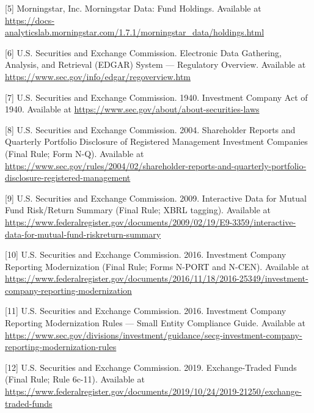 \documentclass[sigconf]{acmart}
\begin{document}
[5] Morningstar, Inc. Morningstar Data: Fund Holdings. Available at
\url{https://docs-analyticslab.morningstar.com/1.7.1/morningstar_data/holdings.html}

[6] U.S. Securities and Exchange Commission. Electronic Data Gathering,
Analysis, and Retrieval (EDGAR) System --- Regulatory Overview. Available
at \url{https://www.sec.gov/info/edgar/regoverview.htm}

[7] U.S. Securities and Exchange Commission. 1940. Investment Company Act
of 1940. Available at \url{https://www.sec.gov/about/about-securities-laws}

[8] U.S. Securities and Exchange Commission. 2004. Shareholder Reports and
Quarterly Portfolio Disclosure of Registered Management Investment
Companies (Final Rule; Form N-Q). Available at
\url{https://www.sec.gov/rules/2004/02/shareholder-reports-and-quarterly-portfolio-disclosure-registered-management}

[9] U.S. Securities and Exchange Commission. 2009. Interactive Data for
Mutual Fund Risk/Return Summary (Final Rule; XBRL tagging). Available at
\url{https://www.federalregister.gov/documents/2009/02/19/E9-3359/interactive-data-for-mutual-fund-riskreturn-summary}

[10] U.S. Securities and Exchange Commission. 2016. Investment Company
Reporting Modernization (Final Rule; Forms N-PORT and N-CEN). Available at
\url{https://www.federalregister.gov/documents/2016/11/18/2016-25349/investment-company-reporting-modernization}

[11] U.S. Securities and Exchange Commission. 2016. Investment Company
Reporting Modernization Rules --- Small Entity Compliance Guide. Available
at
\url{https://www.sec.gov/divisions/investment/guidance/secg-investment-company-reporting-modernization-rules}

[12] U.S. Securities and Exchange Commission. 2019. Exchange-Traded Funds
(Final Rule; Rule 6c-11). Available at
\url{https://www.federalregister.gov/documents/2019/10/24/2019-21250/exchange-traded-funds}
\end{document}
